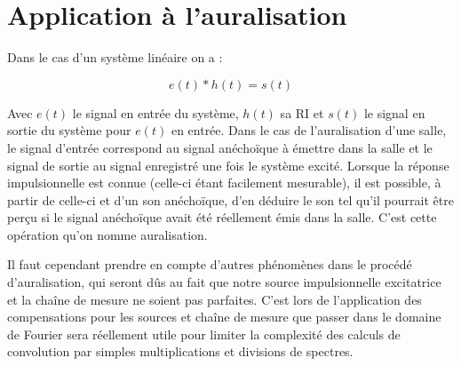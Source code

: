 \section{Application à l'auralisation} %

Dans le cas d'un système linéaire on a :

\begin{equation}
e(t) \ast h(t) = s(t)
\end{equation}

Avec $e(t)$ le signal en entrée du système, $h(t)$ sa RI et $s(t)$ le signal en sortie du système pour $e(t)$ en entrée.
Dans le cas de l'auralisation d'une salle, le signal d'entrée correspond au signal anéchoïque à émettre dans la salle et le signal de sortie au signal enregistré une fois le système excité.
Lorsque la réponse impulsionnelle est connue (celle-ci étant facilement mesurable), il est possible, à partir de celle-ci et d'un son anéchoïque, d'en déduire le son tel qu'il pourrait être perçu si le signal anéchoïque avait été réellement émis dans la salle. C'est cette opération qu'on nomme auralisation.


Il faut cependant prendre en compte d'autres phénomènes dans le procédé d'auralisation, qui seront dûs au fait que notre source impulsionnelle excitatrice et la chaîne de mesure ne soient pas parfaites.
C'est lors de l'application des compensations pour les sources et chaîne de mesure que passer dans le domaine de Fourier
sera réellement utile pour limiter la complexité des calculs de convolution par simples multiplications et divisions de spectres.
